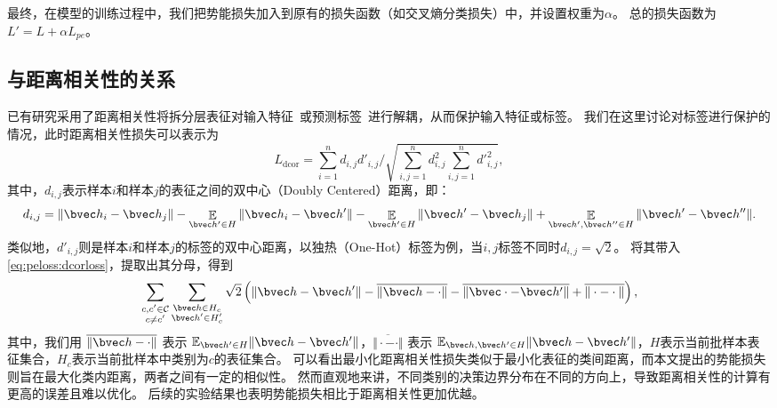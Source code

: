 最终，在模型的训练过程中，我们把势能损失加入到原有的损失函数（如交叉熵分类损失）中，并设置权重为$\alpha$。
总的损失函数为$L' = L + \alpha L_{pe}$。

\subsection{与距离相关性的关系}
已有研究采用了距离相关性将拆分层表征对输入特征~\cite{vepakomma2020nopeek}或预测标签~\cite{sunjiankai2022forward_embedding_protect}进行解耦，从而保护输入特征或标签。
%
我们在这里讨论对标签进行保护的情况，此时距离相关性损失可以表示为
\begin{equation}
\label{eq:peloss:dcorloss}
    L_\text{dcor} = \sum_{i=1}^n d_{i,j} d'_{i, j} \Big/ \sqrt{\sum_{i,j=1}^n d_{i, j}^2 \sum_{i,j=1}^n {d'}_{i, j}^2},
\end{equation}
%
其中，$d_{i,j}$表示样本$i$和样本$j$的表征之间的双中心（Doubly Centered）距离，即：
\begin{equation}
    d_{i, j} = \Vert \bvec h_i - \bvec h_j \Vert - \mathop{\mathbb E}_{\bvec h'\in H}\Vert \bvec h_i - \bvec h' \Vert - \mathop{\mathbb E}_{\bvec h'\in H}\Vert \bvec h' - \bvec h_j \Vert + \mathop{\mathbb E}_{\bvec h', \bvec h'' \in H}\Vert \bvec h' - \bvec h'' \Vert.
\end{equation}
%
类似地，$d'_{i,j}$则是样本$i$和样本$j$的标签的双中心距离，以独热（One-Hot）标签为例，当$i,j$标签不同时$d_{i,j} = \sqrt 2$。
将其带入\autoref{eq:peloss:dcorloss}，提取出其分母，得到
\begin{equation}
    \sum_{\substack{c,c'\in \mathcal C \\ c\ne c'}} \sum_{\substack{\bvec h\in H_c \\ \bvec h' \in H_c'}} \sqrt2 
    \left( 
        \Vert \bvec h - \bvec h'\Vert - \overline{\Vert \bvec h - \cdot \Vert} - \overline{\Vert \bvec \cdot - \bvec h' \Vert} + \overline{\Vert \cdot - \cdot\Vert}
    \right),
\end{equation}
其中，我们用 $\overline{\Vert \bvec h - \cdot \Vert}$ 表示 $\mathbb E_{\bvec h'\in H} \Vert \bvec h - \bvec h'\Vert$，$\overline{\Vert \cdot - \cdot \Vert}$ 表示 $\mathbb E_{\bvec h, \bvec h'\in H} \Vert \bvec h - \bvec h'\Vert$，$H$表示当前批样本表征集合，$H_c$表示当前批样本中类别为$c$的表征集合。
%
可以看出最小化距离相关性损失类似于最小化表征的类间距离，而本文提出的势能损失则旨在最大化类内距离，两者之间有一定的相似性。
%
然而直观地来讲，不同类别的决策边界分布在不同的方向上，导致距离相关性的计算有更高的误差且难以优化。
%
后续的实验结果也表明势能损失相比于距离相关性更加优越。



